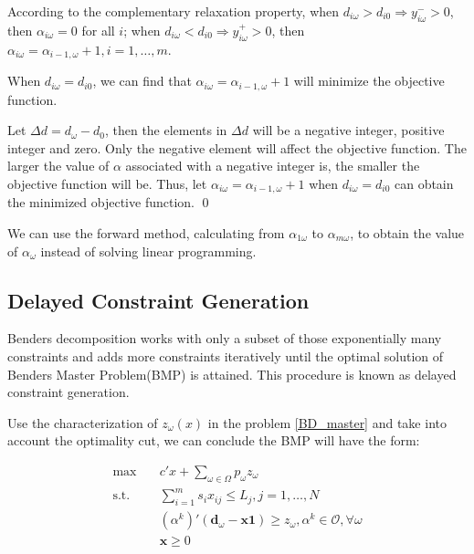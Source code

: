 \begin{pf}
  According to the complementary relaxation property, when
$d_{i \omega} > d_{i 0} \Rightarrow y_{i \omega}^{-} >0$, then $\alpha_{i \omega} =0$ for all $i$; when $d_{i \omega} < d_{i 0} \Rightarrow y_{i \omega}^{+} >0$, then $\alpha_{i \omega} = \alpha_{i-1,\omega} +1, i =1,\ldots,m$. 

When $d_{i \omega} = d_{i 0}$,  we can find that $\alpha_{i \omega} = \alpha_{i-1, \omega} + 1$ will minimize the objective function.

Let $\Delta d = d_{\omega} - d_0$, then the elements in $\Delta d$ will be a negative integer, positive integer and zero. 
Only the negative element will affect the objective function.
The larger the value of $\alpha$ associated with a negative integer is, the smaller the objective function will be. Thus, let $\alpha_{i \omega} = \alpha_{i-1, \omega} + 1$ when $d_{i \omega} = d_{i 0}$ can obtain the minimized objective function.
\qed
\end{pf}

We can use the forward method, calculating from $\alpha_{1 \omega}$ to $\alpha_{m \omega}$, to obtain the value of $\alpha_{\omega}$ instead of solving linear programming.

\subsection{Delayed Constraint Generation}\label{bender_stage}
Benders decomposition works with only a subset of those exponentially many constraints and adds more constraints iteratively until the optimal solution of Benders Master Problem(BMP) is attained. This procedure is known as delayed constraint generation.

Use the characterization of $z_{\omega}(x)$ in the problem \eqref{BD_master} and take into account the optimality cut, we can conclude the BMP will have the form:

\begin{equation}\label{BD_master2}
  \begin{aligned}
    \max \quad & c{'} x + \sum_{\omega \in \Omega} p_{\omega} z_{\omega} \\
    \text {s.t.} \quad & \sum_{i=1}^{m} s_{i} x_{ij} \leq L_j, j =1,\ldots, N \\
    & (\alpha^{k}){'}(\mathbf{d}_{\omega}- \mathbf{x} \mathbf{1}) \geq z_{\omega}, \alpha^k \in \mathcal{O}, \forall \omega \\
     & \mathbf{x} \geq 0
  \end{aligned}
\end{equation}

